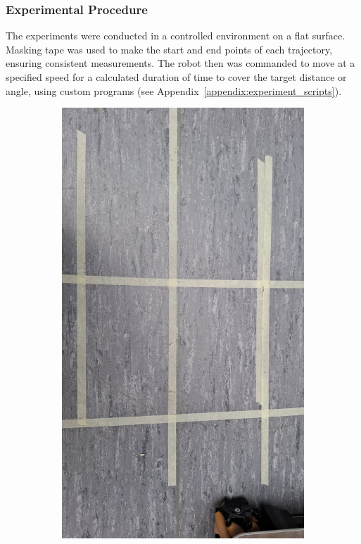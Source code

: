\documentclass[a4paper, 12pt]{article}
\begin{document}
    \subsubsection{Experimental Procedure}

    The experiments were conducted in a controlled environment on a flat surface. Masking tape was used to make the start and end points of each trajectory, ensuring consistent measurements. The robot then was commanded to move at a specified speed for a calculated duration of time to cover the target distance or angle, using custom programs (see Appendix~\ref{appendix:experiment_scripts}). 

    \begin{figure}[H]
        \centering
        \begin{subfigure}[t]{0.49\linewidth}
            \centering
            \includegraphics[width=\linewidth]{images/sec4/experiment_tape.jpg}

\end{subfigure}
\end{figure}
\end{document}
